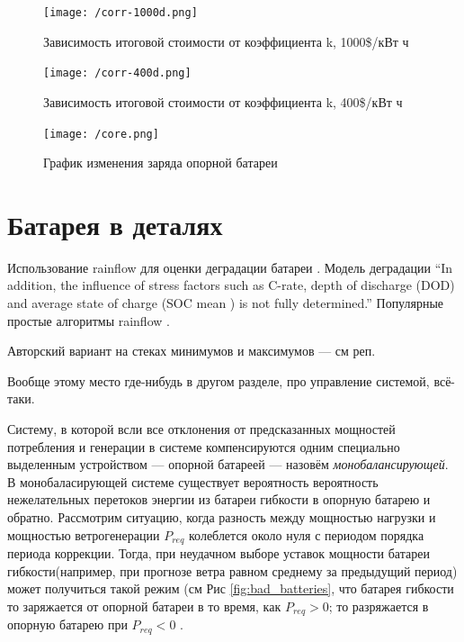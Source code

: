 \documentclass{report}
\begin{document}
    
    \begin{figure}[]
\texttt{[image: /corr-1000d.png]}
\centering
\caption{Зависимость итоговой стоимости от коэффициента k, 1000\$/кВт ч}
\label{fig:corr-1000}
\end{figure}

\begin{figure}[]
\texttt{[image: /corr-400d.png]}
\centering
\caption{Зависимость итоговой стоимости от коэффициента k, 400\$/кВт ч}
\label{fig:corr-400}
\end{figure}

\begin{figure}[]
\texttt{[image: /core.png]}
\centering
\caption{График изменения заряда опорной батареи}
\label{fig:core}
\end{figure}


\chapter{Батарея в деталях}

Использование rainflow для оценки деградации батареи \cite{xu2016modeling}.
Модель деградации \cite{laresgoiti2015modeling} ``In addition, the
influence of stress factors such as C-rate, depth of discharge (DOD)
and average state of charge (SOC mean ) is not fully determined.''
Популярные простые алгоритмы rainflow \cite{downing1982simple}.

Авторский вариант на стеках минимумов и максимумов --- см реп.


Вообще этому место где-нибудь в другом разделе, про управление системой, всё-таки.

Систему, в которой всли все отклонения от предсказанных мощностей потребления и генерации в системе компенсируются одним специально выделенным устройством --- опорной батареей --- назовём \textit{монобалансирующей}.
В монобаласирующей системе существует вероятность вероятность нежелательных перетоков энергии из батареи гибкости в опорную батарею и обратно.
Рассмотрим ситуацию, когда разность между мощностью нагрузки и мощностью ветрогенерации $P_{req}$  колеблется около нуля с периодом порядка периода коррекции. 
Тогда, при неудачном выборе уставок мощности батареи гибкости(например, при прогнозе ветра равном среднему за предыдущий период) может получиться такой режим (см Рис \ref{fig:bad_batteries}, что батарея гибкости то заряжается от опорной батареи в то время, как $P_{req} > 0$; то разряжается в опорную батарею при $P_{req} < 0$ .
\end{document}
